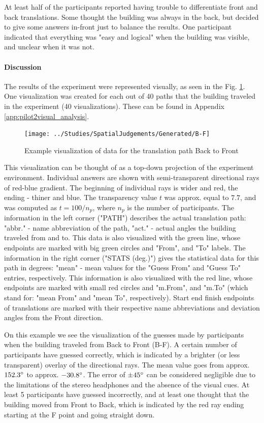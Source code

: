 At least half of the participants reported having trouble to differentiate front and back translations. Some thought the building was always in the back, but decided to give some answers in-front just to balance the results. One participant indicated that everything was "easy and logical" when the building was visible, and unclear when it was not.

\paragraph{Discussion}
The results of the experiment were represented visually, as seen in the Fig. \ref{fig:b-f}. One visualization was created for each out of 40 paths that the building traveled in the experiment (40 visualizations). These can be found in Appendix \ref{app:pilot2visual_analysis}.

\begin{figure}
	\centering
	\texttt{[image: ../Studies/SpatialJudgements/Generated/B-F]}
	\caption{Example visualization of data for the translation path Back to Front}
	\label{fig:b-f}
\end{figure}

This visualization can be thought of as a top-down projection of the experiment environment.
Individual answers are shown with semi-transparent directional rays of red-blue gradient. The beginning of individual rays is wider and red, the ending - thiner and blue. The transparency value $t$ was approx. equal to $7.7$, and was computed as $t = 100 / n_{p}$, where $ n_{p} $ is the number of participants.
The information in the left corner ("PATH") describes the actual translation path: "abbr." - name abbreviation of the path, "act." - actual angles the building traveled from and to. This data is also visualized with the green line, whose endpoints are marked with big green circles and "From", and "To" labels.
The information in the right corner ("STATS (deg.)") gives the statistical data for this path in degrees: "mean" - mean values for the "Guess From" and "Guess To" entries, respectively. This information is also visualized with the red line, whose endpoints are marked with small red circles and "m.From", and "m.To" (which stand for: "mean From" and "mean To", respectively).
Start end finish endpoints of translations are marked with their respective name abbreviations and deviation angles from the Front direction.

On this example we see the visualization of the guesses made by participants when the building traveled from Back to Front (B-F). A certain number of participants have guessed correctly, which is indicated by a brighter (or less transparent) overlay of the directional rays. The mean value goes from approx. $152.3\degree$ to approx. $- 30.8\degree$. The error of $\pm 45\degree$ can be considered negligible due to the limitations of the stereo headphones and the absence of the visual cues. At least 5 participants have guessed incorrectly, and at least one thought that the building moved from Front to Back, which is indicated by the red ray ending starting at the F point and going straight down.



